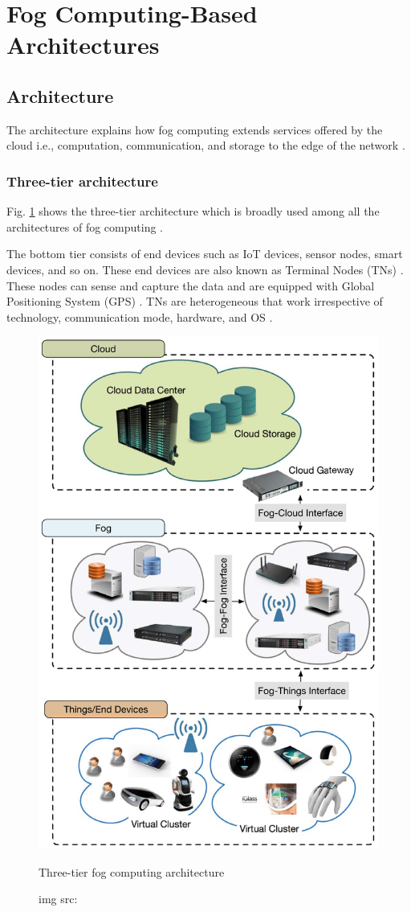 \section{Fog Computing-Based Architectures}
\label{sec:3}


\subsection{Architecture}

The architecture explains how fog computing extends services offered by the cloud i.e., computation, communication, and storage to the edge of the network \cite{mukherjee2018survey}.


\subsubsection{Three-tier architecture}

Fig. \ref{fig:three-tier fog computing architecture} shows the three-tier architecture which is broadly used among all the architectures of fog computing \cite{mukherjee2018survey}. \par

The bottom tier consists of end devices such as IoT devices, sensor nodes, smart devices, and so on. These end devices are also known as Terminal Nodes (TNs) \cite{mukherjee2018survey}. These nodes can sense and capture the data \cite{webpage} and are equipped with Global Positioning System (GPS) \cite{mukherjee2018survey}. TNs are heterogeneous that work irrespective of technology, communication mode, hardware, and OS \cite{webpage}. \par

\begin{figure}[H]
    \centering
    \includegraphics[width=.5\linewidth]{image/Three-tier fog computing architecture.png}
    \caption{Three-tier fog computing architecture}
    \caption*{img src: \cite{mukherjee2018survey}}
    \label{fig:three-tier fog computing architecture}
\end{figure}

